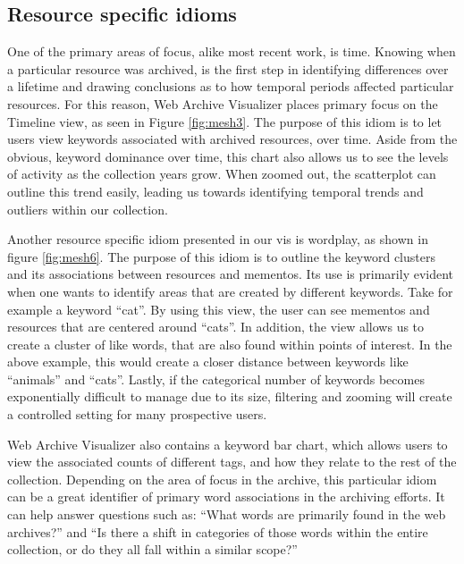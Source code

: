 \documentclass[10pt,journal,compsoc]{IEEEtran}
\begin{document}
\subsection{Resource specific idioms}
One of the primary areas of focus, alike most recent work, is time. Knowing when a particular resource was archived, is the first step in identifying differences over a lifetime and drawing conclusions as to how temporal periods affected particular resources. For this reason, Web Archive Visualizer places primary focus on the Timeline view, as seen in Figure \ref{fig:mesh3}. The purpose of this idiom is to let users view keywords associated with archived resources, over time. Aside from the obvious, keyword dominance over time, this chart also allows us to see the levels of activity as the collection years grow. When zoomed out, the scatterplot can outline this trend easily, leading us towards identifying temporal trends and outliers within our collection. \par

Another resource specific idiom presented in our vis is wordplay, as shown in figure \ref{fig:mesh6}. The purpose of this idiom is to outline the keyword clusters and its associations between resources and mementos. Its use is primarily evident when one wants to identify areas that are created by different keywords. Take for example a keyword ``cat''. By using this view, the user can see mementos and resources that are centered around ``cats''. In addition, the view allows us to create a cluster of like words, that are also found within points of interest. In the above example, this would create a closer distance between keywords like ``animals'' and ``cats''. Lastly, if the categorical number of keywords becomes exponentially difficult to manage due to its size, filtering and zooming will create a controlled setting for many prospective users. \par

Web Archive Visualizer also contains a keyword bar chart, which allows users to view the associated counts of different tags, and how they relate to the rest of the collection. Depending on the area of focus in the archive, this particular idiom can be a great identifier of primary word associations in the archiving efforts. It can help answer questions such as: ``What words are primarily found in the web archives?'' and ``Is there a shift in categories of those words within the entire collection, or do they all fall within a similar scope?'' \par 
\end{document}
